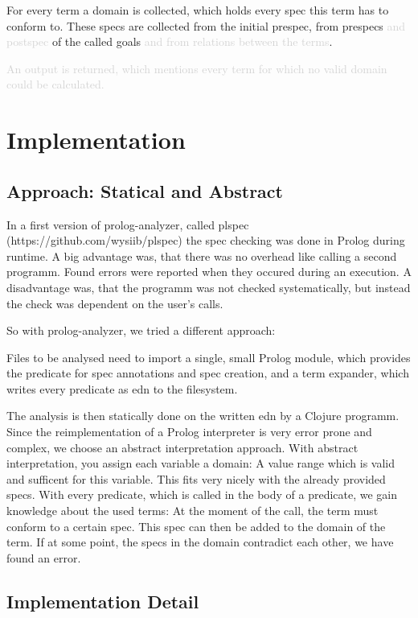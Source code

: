 \documentclass[a4paper]{article}
\newcommand{\future}[1]{\textcolor{lightgray}{#1}}
\begin{document}
For every term a domain is collected, which holds every spec this term has to
conform to. These specs are collected from the initial prespec, from prespecs
\future{and postspec} of the called goals
\future{and from relations between the terms}.

\future{An output is returned, which mentions every term for which
no valid domain could be calculated. }

\section{Implementation}
\subsection{Approach: Statical and Abstract}
In a first version of prolog-analyzer, called plspec
(https://github.com/wysiib/plspec) the spec checking was done in Prolog during
runtime. A big advantage was, that there was no overhead like calling a second
programm. Found errors were reported when they occured during an execution. A
disadvantage was, that the programm was not checked systematically, but instead
the check was dependent on the user's calls.



So with prolog-analyzer, we tried a different approach:

Files to be analysed need to import a single, small Prolog module, which
provides the predicate for spec annotations and spec creation, and a term
expander, which writes every predicate as edn to the filesystem.


The analysis is then statically done on the written edn by a Clojure programm.
Since the reimplementation of a Prolog interpreter is very error prone and
complex, we choose an abstract interpretation approach. With abstract
interpretation, you assign each variable a domain: A value range which is valid
and sufficent for this variable. This fits very nicely with the already provided
specs.
With every predicate, which is called in the body of a predicate, we gain
knowledge about the used terms: At the moment of the call, the term must
conform to a certain spec. This spec can then be added to the domain of the
term. If at some point, the specs in the domain contradict each other, we have
found an error.

\subsection{Implementation Detail}
\end{document}
